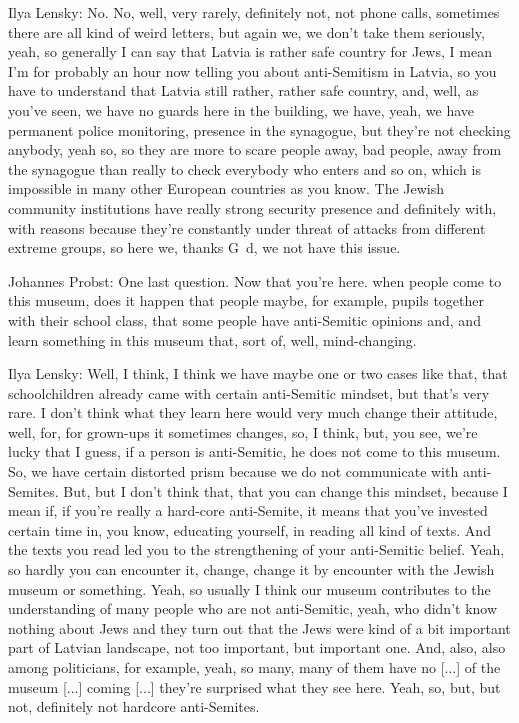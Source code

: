 Ilya Lensky: No. No, well, very rarely, definitely not, not phone calls, sometimes there are all kind of weird letters, but again we, we don’t take them seriously, yeah, so generally I can say that Latvia is rather safe country for Jews, I mean I’m for probably an hour now telling you about anti-Semitism in Latvia, so you have to understand that Latvia still rather, rather safe country, and, well, as you’ve seen, we have no guards here in the building, we have, yeah, we have permanent police monitoring, presence in the synagogue, but they’re not checking anybody, yeah so, so they are more to scare people away, bad people, away from the synagogue than really to check everybody who enters and so on, which is impossible in many other European countries as you know.
The Jewish community institutions have really strong security presence and definitely with, with reasons because they’re constantly under threat of attacks from different extreme groups, so here we, thanks G~d, we not have this issue. 

Johannes Probst: One last question. Now that you’re here. when people come to this museum, does it happen that people maybe, for example, pupils together with their school class, that some people have anti-Semitic opinions and, and learn something in this museum that, sort of, well, mind-changing. 

Ilya Lensky: Well, I think, I think we have maybe one or two cases like that, that schoolchildren already came with certain anti-Semitic mindset, but that’s very rare. I don’t think what they learn here would very much change their attitude, well, for, for grown-ups it sometimes changes, so, I think, but, you see, we’re lucky that I guess, if a person is anti-Semitic, he does not come to this museum. So, we have certain distorted prism because we do not communicate with anti-Semites. 
But, but I don’t think that, that you can change this mindset, because I mean if, if you’re really a hard-core anti-Semite, it means that you’ve invested certain time in, you know, educating yourself, in reading all kind of texts. And the texts you read led you to the strengthening of your anti-Semitic belief. Yeah, so hardly you can encounter it, change, change it by encounter with the Jewish museum or something. Yeah, so usually I think our museum contributes to the understanding of many people who are not anti-Semitic, yeah, who didn’t know nothing about Jews and they turn out that the Jews were kind of a bit important part of Latvian landscape, not too important, but important one. And, also, also among politicians, for example, yeah, so many, many of them have no [...] of the museum [...] coming [...] they’re surprised what they see here. Yeah, so, but, but not, definitely not hardcore anti-Semites. 

